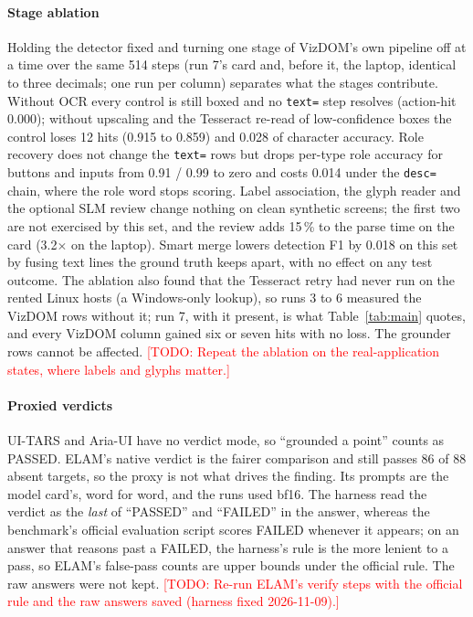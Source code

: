 \documentclass[conference]{IEEEtran}
\newcommand{\code}[1]{\texttt{#1}}
\newcommand{\todo}[1]{\textcolor{red}{[TODO: #1]}}
\begin{document}
\paragraph{Stage ablation} Holding the detector fixed and turning one stage of VizDOM's own pipeline off at a time over the same 514 steps (run 7's card and, before it, the laptop, identical to three decimals; one run per column) separates what the stages contribute. Without OCR every control is still boxed and no \code{text=} step resolves (action-hit 0.000); without upscaling and the Tesseract re-read of low-confidence boxes the control loses 12 hits (0.915 to 0.859) and 0.028 of character accuracy. Role recovery does not change the \code{text=} rows but drops per-type role accuracy for buttons and inputs from 0.91 / 0.99 to zero and costs 0.014 under the \code{desc=} chain, where the role word stops scoring. Label association, the glyph reader and the optional SLM review change nothing on clean synthetic screens; the first two are not exercised by this set, and the review adds 15\,\% to the parse time on the card (3.2$\times$ on the laptop). Smart merge lowers detection F1 by 0.018 on this set by fusing text lines the ground truth keeps apart, with no effect on any test outcome. The ablation also found that the Tesseract retry had never run on the rented Linux hosts (a Windows-only lookup), so runs 3 to 6 measured the VizDOM rows without it; run 7, with it present, is what Table~\ref{tab:main} quotes, and every VizDOM column gained six or seven hits with no loss. The grounder rows cannot be affected. \todo{Repeat the ablation on the real-application states, where labels and glyphs matter.}

\paragraph{Proxied verdicts} UI-TARS and Aria-UI have no verdict mode, so ``grounded a point'' counts as PASSED. ELAM's native verdict is the fairer comparison and still passes 86 of 88 absent targets, so the proxy is not what drives the finding. Its prompts are the model card's, word for word, and the runs used bf16. The harness read the verdict as the \emph{last} of ``PASSED'' and ``FAILED'' in the answer, whereas the benchmark's official evaluation script scores FAILED whenever it appears; on an answer that reasons past a FAILED, the harness's rule is the more lenient to a pass, so ELAM's false-pass counts are upper bounds under the official rule. The raw answers were not kept. \todo{Re-run ELAM's verify steps with the official rule and the raw answers saved (harness fixed 2026-11-09).}
\end{document}

